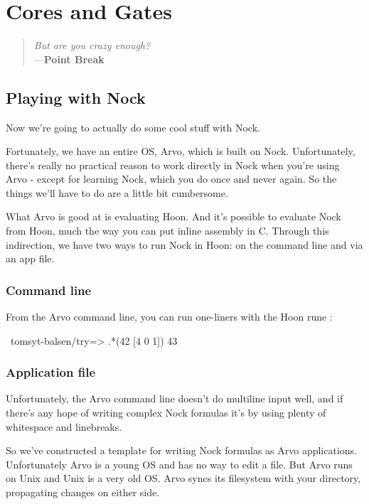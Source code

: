 \chapter{Cores and Gates}

\begin{quote}
\noindent \emph{But are you crazy enough?}
\medskip \\
---\textbf{Point Break}
\end{quote}

\section{Playing with Nock}

Now we're going to actually do some cool stuff with Nock.

Fortunately, we have an entire OS, Arvo, which is built on Nock.
Unfortunately, there's really no practical reason to work
directly in Nock when you're using Arvo - except for learning
Nock, which you do once and never again.  So the things we'll
have to do are a little bit cumbersome.

What Arvo is good at is evaluating Hoon.  And it's possible to
evaluate Nock from Hoon, much the way you can put inline assembly
in C.  Through this indirection, we have two ways to run Nock in
Hoon: on the command line and via an app file.

\subsection{Command line}

From the Arvo command line, you can run one-liners with the Hoon
rune :

\begin{code}
~tomsyt-balsen/try=> .*(42 [4 0 1])
43
\end{code}

\subsection{Application file}

Unfortunately, the Arvo command line doesn't do multiline input
well, and if there's any hope of writing complex Nock formulas
it's by using plenty of whitespace and linebreaks.

So we've constructed a template for writing Nock formulas as Arvo
applications.  Unfortunately Arvo is a young OS and has no way to
edit a file.  But Arvo runs on Unix and Unix is a very old OS.
Arvo syncs its filesystem with your  directory,
propagating changes on either side.

